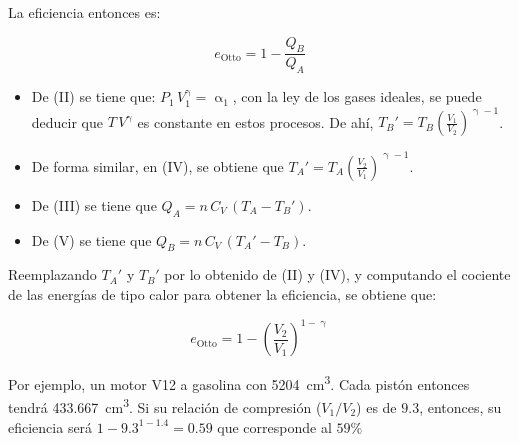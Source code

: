 \begin{center}
\end{center}

La eficiencia entonces es:

\[e_{\text{Otto}} = 1 - \frac{Q_B}{Q_A}\]

\begin{itemize}
  \item De (II) se tiene que: $P_1\,V_1^\upgamma = \upalpha_1$, con la ley de
  los gases ideales, se puede deducir que $T\,V^\upgamma$ es constante en
  estos procesos. De ahí, $T_B' = T_B \left(\frac{V_1}{V_2}\right)^{\upgamma-1}$.

  \item De forma similar, en (IV), se obtiene que
  $T_A' = T_A \left(\frac{V_2}{V_1}\right)^{\upgamma-1}$.

  \item De (III) se tiene que $Q_A = n\,C_V\,(T_A - T_B')$.
  
  \item De (V) se tiene que $Q_B = n\,C_V\,(T_A' - T_B)$.
\end{itemize}

Reemplazando $T_A'$ y $T_B'$ por lo obtenido de (II) y (IV), y computando
el cociente de las energías de tipo calor para obtener la eficiencia,
se obtiene que:

\[e_{\text{Otto}} = 1 - \left(\frac{V_2}{V_1}\right)^{1 - \upgamma}\]

Por ejemplo, un motor V12 a gasolina con \qty{5204}{\cm^3}. Cada pistón entonces
tendrá \qty{433.667}{\cm^3}. Si su relación de compresión ($V_1/V_2$)
es de $9.3$, entonces, su eficiencia será $1 - 9.3^{1 - 1.4} = 0.59$ que
corresponde al $59\%$
